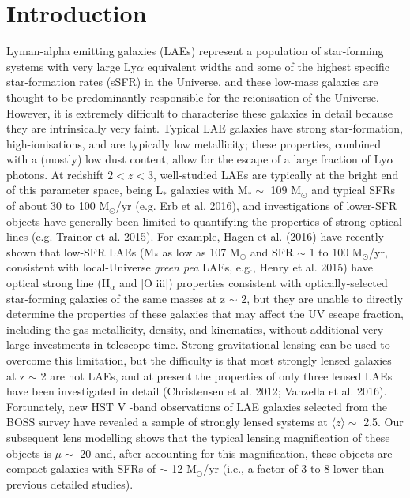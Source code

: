 \documentclass[a4paper,fleqn,usenatbib]{mnras}
\begin{document}
\section{Introduction}
Lyman-alpha emitting galaxies (LAEs) represent a population of star-forming systems with very large Ly$\alpha$ equivalent widths and some of the highest specific star-formation rates (sSFR) in the Universe, and these low-mass galaxies are thought to be predominantly responsible for the reionisation of the Universe. However, it is extremely difficult to characterise these galaxies in detail because they are intrinsically very faint. Typical LAE galaxies have strong star-formation, high-ionisations, and are typically low metallicity; these properties, combined with a (mostly) low dust content, allow for the escape of a large fraction of Ly$\alpha$ photons. At redshift  $2 < z < 3$, well-studied LAEs are typically at the bright end of this parameter space, being  L$_\text{*}$ galaxies with M$_\text{*} \sim$ 109 M$_\odot$ and typical SFRs of about 30 to 100 M$_\odot$/yr (e.g. Erb et al. 2016), and investigations of lower-SFR objects have generally been limited to quantifying the properties of strong optical lines (e.g. Trainor et al. 2015). For example, Hagen et al. (2016) have recently shown that low-SFR LAEs (M$_\text{*}$ as low as 107 M$_\odot$ and SFR $\sim$ 1 to 100 M$_\odot$/yr, consistent with local-Universe \emph{green pea} LAEs, e.g., Henry et al. 2015) have optical strong line (H$_\alpha$ and [O iii]) properties consistent with optically-selected star-forming galaxies of the same masses at z $\sim$ 2, but they are unable to directly determine the properties of these galaxies that may affect the UV escape fraction, including the gas metallicity, density, and kinematics, without additional very large investments in telescope time.
Strong gravitational lensing can be used to overcome this limitation, but the difficulty is that most strongly lensed galaxies at z $\sim$ 2 are not LAEs, and at present the properties of only three lensed LAEs have been investigated in detail (Christensen et al. 2012; Vanzella et al. 2016). Fortunately, new HST V -band observations of LAE galaxies selected from the BOSS survey have revealed a sample of strongly lensed systems at  $\langle z\rangle \sim$ 2.5. Our subsequent lens modelling shows that the typical lensing magnification of these objects is $\mu \sim$ 20 and, after accounting for this magnification, these objects are compact galaxies with SFRs of $\sim$ 12 M$_\odot$/yr (i.e., a factor of 3 to 8 lower than previous detailed studies).
\end{document}
